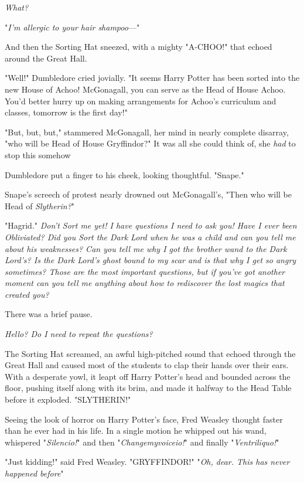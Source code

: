 \emph{What?}

"\emph{I'm allergic to your hair shampoo}—"

And then the Sorting Hat sneezed, with a mighty "A-CHOO!" that echoed around
the Great Hall.

"Well!" Dumbledore cried jovially. "It seems Harry Potter has been sorted into
the new House of Achoo! McGonagall, you can serve as the Head of House Achoo.
You'd better hurry up on making arrangements for Achoo's curriculum and
classes, tomorrow is the first day!"

"But, but, but," stammered McGonagall, her mind in nearly complete disarray,
"who will be Head of House Gryffindor?" It was all she could think of, she
\emph{had} to stop this somehow{\el}

Dumbledore put a finger to his cheek, looking thoughtful. "Snape."

Snape's screech of protest nearly drowned out McGonagall's, "Then who will be
Head of \emph{Slytherin?}"

"Hagrid."
\sbreak
\emph{Don't Sort me yet! I have questions I need to ask you! Have I ever been
Obliviated? Did you Sort the Dark Lord when he was a child and can you tell me
about his weaknesses? Can you tell me why I got the brother wand to the Dark
Lord's? Is the Dark Lord's ghost bound to my scar and is that why I get so
angry sometimes? Those are the most important questions, but if you've got
another moment can you tell me anything about how to rediscover the lost magics
that created you?}

There was a brief pause.

\emph{Hello? Do I need to repeat the questions?}

The Sorting Hat screamed, an awful high-pitched sound that echoed through the
Great Hall and caused most of the students to clap their hands over their ears.
With a desperate yowl, it leapt off Harry Potter's head and bounded across the
floor, pushing itself along with its brim, and made it halfway to the Head
Table before it exploded.
\sbreak
"SLYTHERIN!"

Seeing the look of horror on Harry Potter's face, Fred Weasley thought faster
than he ever had in his life. In a single motion he whipped out his wand,
whispered "\emph{Silencio!}" and then "\emph{Changemyvoiceio!}" and finally
"\emph{Ventriliquo!}"

"Just kidding!" said Fred Weasley. "GRYFFINDOR!"
\sbreak
"\emph{Oh, dear. This has never happened before{\el}}"

